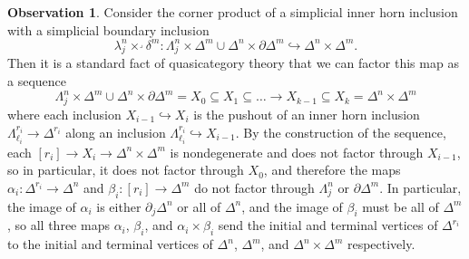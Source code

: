 \documentclass[a4paper]{article}
\numberwithin{equation}{subsection}
\theoremstyle{plain}   %
\theoremstyle{definition}
\newtheorem{obs}[equation]{Observation}
\theoremstyle{remark}
\theoremstyle{plain}
\begin{document}
\begin{obs}\label{simplicialhorns}
	Consider the corner product of a simplicial inner horn inclusion with a simplicial boundary inclusion  
	\[\lambda^n_j\times^\lrcorner \delta^m: \Lambda^n_j \times \Delta^m \cup \Delta^n \times \partial \Delta^m \hookrightarrow \Delta^n\times \Delta^m.\]
	Then it is a standard fact of quasicategory theory that we can factor this map as a sequence
	\[\Lambda^n_j \times \Delta^m \cup \Delta^n \times \partial \Delta^m = X_0 \subseteq X_1 \subseteq \dots \to X_{k-1} \subseteq X_k=\Delta^n\times \Delta^m\]
	where each inclusion \(X_{i-1}\hookrightarrow X_i\) is the pushout of an inner horn inclusion \(\Lambda^{r_i}_{\ell_i} \to \Delta^{r_i}\) along an inclusion \(\Lambda^{r_i}_{\ell_i}\hookrightarrow X_{i-1}\).  By the construction of the sequence, each \([r_i]\to X_i\to \Delta^n\times \Delta^m\) is nondegenerate and does not factor through \(X_{i-1}\), so in particular, it does not factor through \(X_0\), and therefore the maps \(\alpha_i:\Delta^{r_i} \to \Delta^n\) and \(\beta_i:[r_i]\to \Delta^m\) do not factor through \(\Lambda^n_j\) or \(\partial \Delta^m\).  In particular, the image of \(\alpha_i\) is either \(\partial_j\Delta^n\) or all of \(\Delta^n\), and the image of \(\beta_i\) must be all of \(\Delta^m\), so all three maps \(\alpha_i\), \(\beta_i\), and \(\alpha_i \times \beta_i\) send the initial and terminal vertices of \(\Delta^{r_i}\) to the initial and terminal vertices of \(\Delta^n\), \(\Delta^m\), and \(\Delta^n\times\Delta^m\) respectively.
\end{obs}
\end{document}
